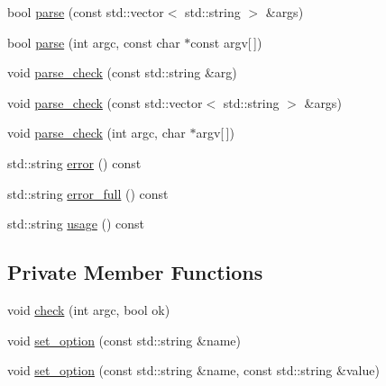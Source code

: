 \begin{DoxyCompactItemize}
\item 
bool \mbox{\hyperlink{classcmdline_1_1parser_a745c9519abe50562987487b6bf794fd7}{parse}} (const std\+::vector$<$ std\+::string $>$ \&args)
\item 
bool \mbox{\hyperlink{classcmdline_1_1parser_a83175f24d7d9e29256b855fb249f427b}{parse}} (int argc, const char $\ast$const argv\mbox{[}$\,$\mbox{]})
\item 
void \mbox{\hyperlink{classcmdline_1_1parser_af22be174b0ab09f03462c02e9afa03c9}{parse\+\_\+check}} (const std\+::string \&arg)
\item 
void \mbox{\hyperlink{classcmdline_1_1parser_a0829039262c93910a9fee8c80f3edb64}{parse\+\_\+check}} (const std\+::vector$<$ std\+::string $>$ \&args)
\item 
void \mbox{\hyperlink{classcmdline_1_1parser_a9c1aebc54c4bc0387c884888185b4941}{parse\+\_\+check}} (int argc, char $\ast$argv\mbox{[}$\,$\mbox{]})
\item 
std\+::string \mbox{\hyperlink{classcmdline_1_1parser_a9bcaaea243a949bf30a40d938480d303}{error}} () const
\item 
std\+::string \mbox{\hyperlink{classcmdline_1_1parser_a0267b636f34a788f57d5eeffcc5daf44}{error\+\_\+full}} () const
\item 
std\+::string \mbox{\hyperlink{classcmdline_1_1parser_a50b57c8179fe1b0dd8f5d2b8e8f3261b}{usage}} () const
\end{DoxyCompactItemize}
\subsection*{Private Member Functions}
\begin{DoxyCompactItemize}
\item 
void \mbox{\hyperlink{classcmdline_1_1parser_aff0a9fa22a3263996f9dff90b16dd661}{check}} (int argc, bool ok)
\item 
void \mbox{\hyperlink{classcmdline_1_1parser_a98e10dc469505563b643ea5166ac1d59}{set\+\_\+option}} (const std\+::string \&name)
\item 
void \mbox{\hyperlink{classcmdline_1_1parser_ab43ce046c972a052c89cd9caaabd4327}{set\+\_\+option}} (const std\+::string \&name, const std\+::string \&value)
\end{DoxyCompactItemize}
